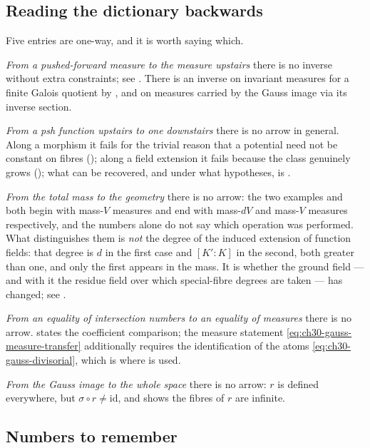 \subsection{Reading the dictionary backwards}
\label{sec:ch30-dict-backward}

Five entries are one-way, and it is worth saying which.

\emph{From a pushed-forward measure to the measure upstairs} there is no
inverse without extra constraints; see
.
There is an inverse on invariant measures for a finite Galois quotient
by , and on measures carried by the
Gauss image via its inverse section.

\emph{From a psh function upstairs to one downstairs} there is no arrow in
general.  Along a morphism it fails for the trivial reason that a potential
need not be constant on fibres
(); along a field extension it fails
because the class genuinely grows
(); what can be recovered, and under what
hypotheses, is .

\emph{From the total mass to the geometry} there is no arrow: the two
examples  and
 both begin with mass-$V$ measures and
end with mass-$dV$ and mass-$V$ measures respectively, and the numbers
alone do not say which operation was performed.  What distinguishes them is
\emph{not} the degree of the induced extension of function fields: that
degree is $d$ in the first case and $[K':K]$ in the second, both greater
than one, and only the first appears in the mass.  It is whether the ground
field --- and with it the residue field over which special-fibre degrees are
taken --- has changed; see .

\emph{From an equality of intersection numbers to an equality of measures}
there is no arrow.   states the
coefficient comparison; the measure statement
\eqref{eq:ch30-gauss-measure-transfer} additionally requires the
identification of the atoms
\eqref{eq:ch30-gauss-divisorial}, which is where
 is used.

\emph{From the Gauss image to the whole space} there is no arrow: $r$ is
defined everywhere, but $\sigma\circ r\neq\mathrm{id}$, and
 shows the fibres of $r$ are infinite.

\subsection{Numbers to remember}
\label{sec:ch30-dict-numbers}

